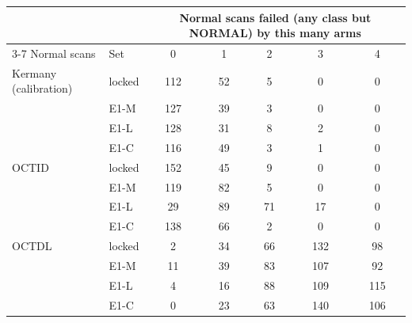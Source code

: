 \begin{tabular}{@{}llccccc@{}}
\toprule
 & & \multicolumn{5}{c}{Normal scans failed (any class but NORMAL) by this many arms} \\
\cmidrule(l){3-7}
Normal scans & Set & 0 & 1 & 2 & 3 & 4 \\
\midrule
Kermany (calibration) & locked & 112 & 52 & 5 & 0 & 0 \\
 & E1-M & 127 & 39 & 3 & 0 & 0 \\
 & E1-L & 128 & 31 & 8 & 2 & 0 \\
 & E1-C & 116 & 49 & 3 & 1 & 0 \\
OCTID & locked & 152 & 45 & 9 & 0 & 0 \\
 & E1-M & 119 & 82 & 5 & 0 & 0 \\
 & E1-L & 29 & 89 & 71 & 17 & 0 \\
 & E1-C & 138 & 66 & 2 & 0 & 0 \\
OCTDL & locked & 2 & 34 & 66 & 132 & 98 \\
 & E1-M & 11 & 39 & 83 & 107 & 92 \\
 & E1-L & 4 & 16 & 88 & 109 & 115 \\
 & E1-C & 0 & 23 & 63 & 140 & 106 \\
\bottomrule
\end{tabular}
